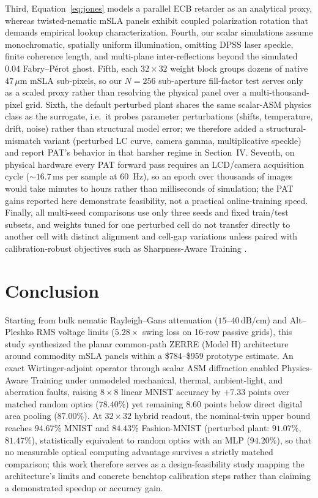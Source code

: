 \documentclass[journal]{IEEEtran}
\begin{document}
Third, Equation~\eqref{eq:jones} models a parallel ECB retarder as an analytical proxy, whereas twisted-nematic mSLA panels exhibit coupled polarization rotation \cite{lu1990lctv} that demands empirical lookup characterization. Fourth, our scalar simulations assume monochromatic, spatially uniform illumination, omitting DPSS laser speckle, finite coherence length, and multi-plane inter-reflections beyond the simulated $0.04$ Fabry--P\'erot ghost. Fifth, each $32\times 32$ weight block groups dozens of native $47\,\mu\text{m}$ mSLA sub-pixels, so our $N=256$ sub-aperture fill-factor test serves only as a scaled proxy rather than resolving the physical panel over a multi-thousand-pixel grid. Sixth, the default perturbed plant shares the same scalar-ASM physics class as the surrogate, i.e.\ it probes parameter perturbations (shifts, temperature, drift, noise) rather than structural model error; we therefore added a structural-mismatch variant (perturbed LC curve, camera gamma, multiplicative speckle) and report PAT's behavior in that harsher regime in Section~IV. Seventh, on physical hardware every PAT forward pass requires an LCD/camera acquisition cycle ($\sim 16.7\,\text{ms}$ per sample at 60~Hz), so an epoch over thousands of images would take minutes to hours rather than milliseconds of simulation; the PAT gains reported here demonstrate feasibility, not a practical online-training speed. Finally, all multi-seed comparisons use only three seeds and fixed train/test subsets, and weights tuned for one perturbed cell do not transfer directly to another cell with distinct alignment and cell-gap variations unless paired with calibration-robust objectives such as Sharpness-Aware Training \cite{sat2026pnn}.

\section{Conclusion}

Starting from bulk nematic Rayleigh--Gans attenuation ($15\text{--}40\,\text{dB/cm}$) and Alt--Pleshko RMS voltage limits ($5.28\times$ swing loss on 16-row passive grids), this study synthesized the planar common-path ZERRE (Model H) architecture around commodity mSLA panels within a \$784--\$959 prototype estimate. An exact Wirtinger-adjoint operator through scalar ASM diffraction enabled Physics-Aware Training under unmodeled mechanical, thermal, ambient-light, and aberration faults, raising $8\times 8$ linear MNIST accuracy by $+7.33$ points over matched random optics ($78.40\%$) yet remaining $8.60$ points below direct digital area pooling ($87.00\%$). At $32\times 32$ hybrid readout, the nominal-twin upper bound reaches $94.67\%$ MNIST and $84.43\%$ Fashion-MNIST (perturbed plant: $91.07\%$, $81.47\%$), statistically equivalent to random optics with an MLP ($94.20\%$), so that no measurable optical computing advantage survives a strictly matched comparison; this work therefore serves as a design-feasibility study mapping the architecture's limits and concrete benchtop calibration steps rather than claiming a demonstrated speedup or accuracy gain.
\end{document}
